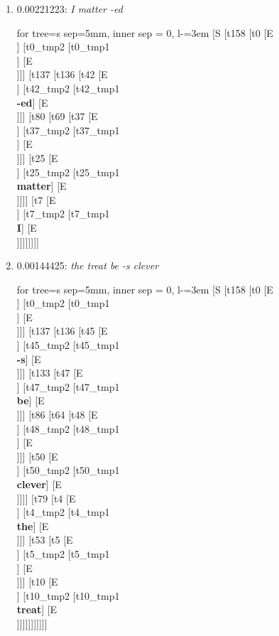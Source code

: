 \documentclass[11pt]{article}
\begin{document}
\begin{enumerate}
	\item  0.00221223: \textit{I matter -ed} \\[0.5em]
	\begin{forest}
	for tree={s sep=5mm, inner sep = 0, l-=3em}
	[S [t158 [t0 [E\\ ] [t0_tmp2 [t0_tmp1\\ ] [E\\ ]]] [t137 [t136 [t42 [E\\ ] [t42_tmp2 [t42_tmp1\\\textbf{-ed}] [E\\ ]]] [t80 [t69 [t37 [E\\ ] [t37_tmp2 [t37_tmp1\\ ] [E\\ ]]] [t25 [E\\ ] [t25_tmp2 [t25_tmp1\\\textbf{matter}] [E\\ ]]]] [t7 [E\\ ] [t7_tmp2 [t7_tmp1\\\textbf{I}] [E\\ ]]]]]]]]
	\end{forest}
	\newpage

	\item  0.00144425: \textit{the treat be -s clever} \\[0.5em]
	\begin{forest}
	for tree={s sep=5mm, inner sep = 0, l-=3em}
	[S [t158 [t0 [E\\ ] [t0_tmp2 [t0_tmp1\\ ] [E\\ ]]] [t137 [t136 [t45 [E\\ ] [t45_tmp2 [t45_tmp1\\\textbf{-s}] [E\\ ]]] [t133 [t47 [E\\ ] [t47_tmp2 [t47_tmp1\\\textbf{be}] [E\\ ]]] [t86 [t64 [t48 [E\\ ] [t48_tmp2 [t48_tmp1\\ ] [E\\ ]]] [t50 [E\\ ] [t50_tmp2 [t50_tmp1\\\textbf{clever}] [E\\ ]]]] [t79 [t4 [E\\ ] [t4_tmp2 [t4_tmp1\\\textbf{the}] [E\\ ]]] [t53 [t5 [E\\ ] [t5_tmp2 [t5_tmp1\\ ] [E\\ ]]] [t10 [E\\ ] [t10_tmp2 [t10_tmp1\\\textbf{treat}] [E\\ ]]]]]]]]]]]
	\end{forest}
	\newpage


\end{enumerate}
\end{document}
